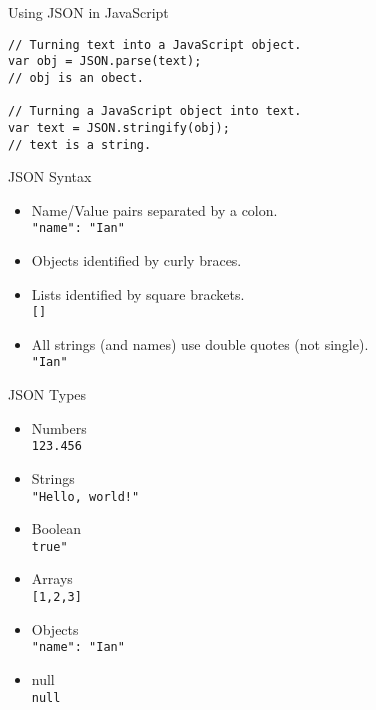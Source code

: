 \begin{frame}[fragile]{Using JSON in JavaScript}
  \begin{verbatim}
// Turning text into a JavaScript object.
var obj = JSON.parse(text);
// obj is an obect.

// Turning a JavaScript object into text.
var text = JSON.stringify(obj);
// text is a string.
  \end{verbatim}
\end{frame}

\begin{frame}{JSON Syntax}
  \begin{itemize}
    \item Name/Value pairs separated by a colon. \\
    \hspace{0.5cm} \texttt{"name": "Ian"}
    \item Objects identified by curly braces. \\
    \hspace{0.5cm} \texttt{{}}
    \item Lists identified by square brackets. \\
    \hspace{0.5cm} \texttt{[]}
    \item All strings (and names) use double quotes (not single). \\
    \hspace{0.5cm} \texttt{"Ian"}
  \end{itemize}
\end{frame}

\begin{frame}{JSON Types}
  \begin{itemize}
    \item Numbers \\
    \hspace{0.5cm} \texttt{123.456}
    \item Strings \\
    \hspace{0.5cm} \texttt{"Hello, world!"}
    \item Boolean \\
    \hspace{0.5cm} \texttt{true"}
    \item Arrays\\
    \hspace{0.5cm} \texttt{[1,2,3]}
    \item Objects\\
    \hspace{0.5cm} \texttt{{"name": "Ian"}}
    \item null \\
    \hspace{0.5cm} \texttt{null}
  \end{itemize}
\end{frame}

